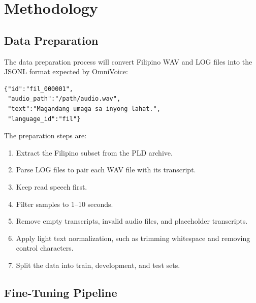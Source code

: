 \documentclass[11pt]{article}
\begin{document}
\section{Methodology}

\subsection{Data Preparation}

The data preparation process will convert Filipino WAV and LOG files into the JSONL format expected by OmniVoice:

\begin{verbatim}
{"id":"fil_000001",
 "audio_path":"/path/audio.wav",
 "text":"Magandang umaga sa inyong lahat.",
 "language_id":"fil"}
\end{verbatim}

The preparation steps are:

\begin{enumerate}
  \item Extract the Filipino subset from the PLD archive.
  \item Parse LOG files to pair each WAV file with its transcript.
  \item Keep read speech first.
  \item Filter samples to 1--10 seconds.
  \item Remove empty transcripts, invalid audio files, and placeholder transcripts.
  \item Apply light text normalization, such as trimming whitespace and removing control characters.
  \item Split the data into train, development, and test sets.
\end{enumerate}

\subsection{Fine-Tuning Pipeline}
\end{document}

